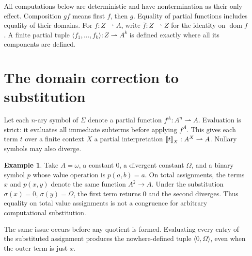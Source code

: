 \documentclass[11pt]{article}
\theoremstyle{definition}
\newtheorem{example}[theorem]{Example}
\newcommand{\N}{\omega}
\newcommand{\dom}{\operatorname{dom}}
\newcommand{\den}[1]{\mathopen{[\mkern-3mu[}#1\mathclose{]\mkern-3mu]}}
\begin{document}
All computations below are deterministic and have nontermination as their
only effect. Composition $gf$ means first $f$, then $g$. Equality of
partial functions includes equality of their domains. For
$f:Z\rightharpoonup A$, write $\bar f:Z\rightharpoonup Z$ for
the identity on $\dom f$. A finite partial tuple
$\langle f_1,\ldots,f_k\rangle:Z\rightharpoonup A^k$ is defined
exactly where all its components are defined.

\section{The domain correction to substitution}

Let each $n$-ary symbol of $\Sigma$ denote a partial function
$f^A:A^n\rightharpoonup A$. Evaluation is strict: it evaluates all
immediate subterms before applying $f^A$. This gives each term $t$ over
a finite context $X$ a partial interpretation
$\den t_X:A^X\rightharpoonup A$. Nullary symbols may also diverge.

\begin{example}\label{ex:weakening}
Take $A=\N$, a constant $0$, a divergent constant $\Omega$, and
a binary symbol $p$ whose value operation is $p(a,b)=a$. On total
assignments, the terms $x$ and $p(x,y)$ denote the same function
$A^2\to A$. Under the substitution
$\sigma(x)=0$, $\sigma(y)=\Omega$, the first term returns $0$
and the second diverges. Thus equality on total value assignments is
not a congruence for arbitrary computational substitution.
\end{example}

The same issue occurs before any quotient is formed. Evaluating every
entry of the substituted assignment produces the nowhere-defined tuple
$\langle0,\Omega\rangle$, even when the outer term is just $x$.
\end{document}
